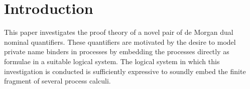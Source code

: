 \documentclass[UKenglish,acmsmall,authorversion]{acmart}
\theoremstyle{plain}
\begin{document}
\section{Introduction}
\label{sec:intro}

This paper investigates the proof theory of a novel pair of de Morgan dual nominal quantifiers.
These quantifiers are motivated by the desire to model private name binders in processes by embedding the processes directly as formulae in a suitable logical system.
The logical system in which this investigation is conducted is sufficiently expressive to soundly embed the finite fragment of several process calculi.
\end{document}
